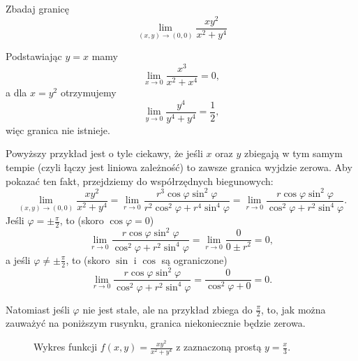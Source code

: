 \begin{example}
    Zbadaj granicę
    \[ \lim_{(x, y)\to (0, 0)} \frac{xy^2}{x^2 + y^4} \]
\end{example}
\begin{solution}
    Podstawiając $y = x$ mamy
    \[ \lim_{x\to 0} \frac{x^3}{x^2 + x^4} = 0, \]
    a dla $x = y^2$ otrzymujemy
    \[ \lim_{y\to 0} \frac{y^4}{y^4 + y^4} = \frac{1}{2}, \]
    więc granica nie istnieje.
\end{solution}

\begin{remark*}
    Powyższy przykład jest o tyle ciekawy, że jeśli $x$ oraz $y$ zbiegają w tym samym tempie (czyli łączy jest liniowa zależność) to zawsze granica wyjdzie zerowa. Aby pokazać ten fakt, przejdziemy do współrzędnych biegunowych:
    \[ \lim_{(x, y)\to (0, 0)} \frac{xy^2}{x^2 + y^4}  = \lim_{r\to 0} \frac{r^3 \cos\varphi\sin^2\varphi}{r^2\cos^2\varphi + r^4\sin^4\varphi} = \lim_{r\to 0} \frac{r \cos\varphi\sin^2\varphi}{\cos^2\varphi + r^2\sin^4\varphi}. \]
    Jeśli $\varphi = \pm\frac{\pi}{2}$, to (skoro $\cos\varphi = 0$)
    \[ \lim_{r\to 0} \frac{r \cos\varphi\sin^2\varphi}{\cos^2\varphi + r^2\sin^4\varphi} = \lim_{r\to 0} \frac{0}{0 \pm r^2} = 0, \]
    a jeśli $\varphi \neq \pm\frac{\pi}{2}$, to (skoro $\sin$ i $\cos$ są ograniczone)
    \[ \lim_{r\to 0} \frac{r \cos\varphi\sin^2\varphi}{\cos^2\varphi + r^2\sin^4\varphi} = \frac{0}{\cos^2\varphi + 0} = 0. \]

    Natomiast jeśli $\varphi$ nie jest stałe, ale na przykład zbiega do $\frac{\pi}{2}$, to, jak można zauważyć na poniższym rusynku, granica niekoniecznie będzie zerowa.
\end{remark*}

\begin{figure}[H]
    \centering
    \caption[short]{Wykres funkcji $f(x, y) = \frac{xy^2}{x^2 + y^4}$ z zaznaczoną prostą $y = \frac{x}{3}$.}
\end{figure}

